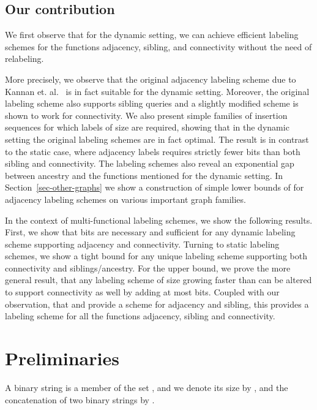 \documentclass{llncs}
\newcommand{\sd}[1]{{#1}}
\newcommand{\drop}[1]{}
\begin{document}
\subsection{Our contribution}
We first \sd{observe} that for \sd{the dynamic setting, we can achieve efficient
labeling schemes for the functions adjacency, sibling, and connectivity
without the need of relabeling.}
\drop{the functions adjacency, sibling and connectivity no
relabeling is required to achieve efficient dynamic labeling schemes.}
More precisely, we observe that the original  adjacency labeling
scheme due to  Kannan et. al.~\cite{Kannan92} is in fact suitable for the
dynamic setting. Moreover, the original labeling scheme also supports sibling
queries and a slightly modified scheme is shown to work for connectivity. We
also present simple families of insertion sequences for which labels of size
 are required, showing that in the dynamic setting the original
labeling schemes are in fact optimal. The result is in contrast to the static
case, where adjacency labels requires strictly fewer bits than both sibling and
connectivity. The labeling schemes also reveal an exponential gap between
ancestry and  the functions mentioned for the dynamic setting. In
Section~\ref{sec-other-graphs} we show a construction of simple lower bounds of
 for adjacency labeling schemes on various important graph
families.

In the context of multi-functional labeling schemes, we show the following
results. First, we show that  bits are necessary and sufficient for
any dynamic labeling scheme supporting adjacency and connectivity. Turning to
static labeling schemes, we show a tight  bound for
any unique labeling scheme supporting both connectivity and siblings/ancestry.
\sd{For the upper bound, we prove the more general result, that}
\drop{In order to show the upper bound, we prove that} any labeling scheme of size
 growing faster than  can be altered to support connectivity as well by adding at most  bits.
\sd{Coupled with our observation, that \cite{Alstrup02} and \cite{Alstrup05}
provide a  scheme for adjacency and sibling, this
provides a  labeling scheme for all the functions
adjacency, sibling and connectivity.}
\section{Preliminaries}
A binary string  is a member of the set , and we denote its size by , and the concatenation of two binary strings  by .
\end{document}
